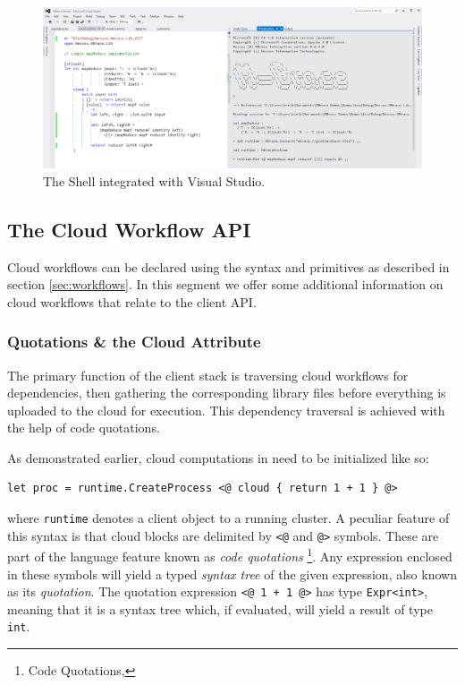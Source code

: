 \begin{figure}[ht]
\label{shellfig}
\centering
\includegraphics[width=\textwidth]{shell.png}
\caption{The \Mbrace{} Shell integrated with Visual Studio.}
\end{figure}

\subsection{The Cloud Workflow API}
\label{sec:client:workflows}

Cloud workflows can be declared using the syntax and primitives as described in section \ref{sec:workflows}.
In this segment we offer some additional information on cloud workflows that relate to the client API.

\subsubsection*{Quotations \& the Cloud Attribute}

The primary function of the \mbrace{} client stack is traversing cloud workflows for dependencies,
then gathering the corresponding \dotnet{} library files before everything is uploaded to the cloud
for execution. This dependency traversal is achieved with the help of \fsharp{} code quotations.

As demonstrated earlier, cloud computations in \mbrace{} need to be initialized like so:
\begin{lstlisting}
let proc = runtime.CreateProcess <@ cloud { return 1 + 1 } @>
\end{lstlisting}
where \texttt{runtime} denotes a client object to a running \mbrace{} cluster.
A peculiar feature of this syntax is that cloud blocks are delimited by \texttt{<@} and 
\texttt{@>} symbols. These are part of the \fsharp{} language feature known as \emph{code quotations}%
\footnote{\fsharp{} Code Quotations, }.
Any \fsharp{} expression enclosed in these symbols will yield a
typed \emph{syntax tree} of the given expression, also known as its \emph{quotation}.
The quotation expression \texttt{<@ 1 + 1 @>} has type \texttt{Expr<int>}, meaning that it is a syntax 
tree which, if evaluated, will yield a result of type \texttt{int}.

